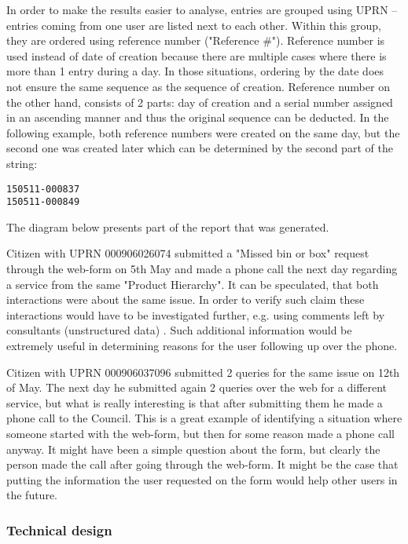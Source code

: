 In order to make the results easier to analyse, entries are grouped using UPRN – entries coming from one user are listed next to each other. Within this group, they are ordered using reference number ("Reference \#"). Reference number is used instead of date of creation because there are multiple cases where there is more than 1 entry during a day. In those situations, ordering by the date does not ensure the same sequence as the sequence of creation. Reference number on the other hand, consists of 2 parts: day of creation and a serial number assigned in an ascending manner and thus the original sequence can be deducted. In the following example, both reference numbers were created on the same day, but the second one was created later which can be determined by the second part of the string:
\begin{lstlisting}
150511-000837
150511-000849
\end{lstlisting}

The diagram below presents part of the report that was generated.

Citizen with UPRN 000906026074 submitted a "Missed bin or box" request through the web-form on 5th May and made a phone call the next day regarding a service from the same "Product Hierarchy". It can be speculated, that both interactions were about the same issue. In order to verify such claim these interactions would have to be investigated further, e.g. using comments left by consultants (unstructured data) \citep{baars2008management}. Such additional information would be extremely useful in determining reasons for the user following up over the phone.

Citizen with UPRN 000906037096 submitted 2 queries for the same issue on 12th of May. The next day he submitted again 2 queries over the web for a different service, but what is really interesting is that after submitting them he made a phone call to the Council. This is a great example of identifying a situation where someone started with the web-form, but then for some reason made a phone call anyway. It might have been a simple question about the form, but clearly the person made the call after going through the web-form. It might be the case that putting the information the user requested on the form would help other users in the future.
		
			\subsubsection{Technical design}
			
